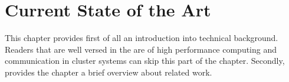 \chapter{Current State of the Art}
\label{sec:state}







This chapter provides first of all an introduction into technical
background. Readers that are well versed in the are of high performance
computing and communication in cluster systems can skip this part of
the chapter. Secondly, provides the chapter a brief overview about
related work.


